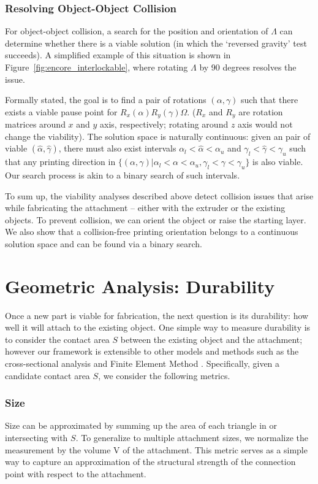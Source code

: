 \subsubsection{Resolving Object-Object Collision}
For object-object collision, a search for the position and orientation of $\Lambda$ can determine whether there is a viable solution (in which the ‘reversed gravity' test succeeds). A simplified example of this situation is shown in Figure~\ref{fig:encore_interlockable}, where rotating $\Lambda$ by 90 degrees resolves the issue.

Formally stated, the goal is to find a pair of rotations $(\alpha, \gamma)$ such that there exists a viable pause point for $R_x(\alpha)R_y(\gamma)\Omega$. ($R_x$ and $R_y$ are rotation matrices around $x$ and $y$ axis, respectively; rotating around $z$ axis would not change the viability). The solution space is naturally continuous: given an pair of viable $(\hat{\alpha}, \hat{\gamma})$, there must also exist intervals $\alpha_l < \hat{\alpha} < \alpha_u$ and $\gamma_l < \hat{\gamma} < \gamma_u$ such that any printing direction in $\{(\alpha, \gamma) | \alpha_l < \alpha < \alpha_u, \gamma_l < \gamma < \gamma_u \}$ is also viable. Our search process is akin to a binary search of such intervals.

To sum up, the viability analyses described above detect collision issues that arise while fabricating the attachment – either with the extruder or the existing objects. To prevent collision, we can orient the object or raise the starting layer. We also show that a collision-free printing orientation belongs to a continuous solution space and can be found via a binary search.

\section{Geometric Analysis: Durability}
Once a new part is viable for fabrication, the next question is its durability: how well it will attach to the existing object. One simple way to measure durability is to consider the contact area $S$ between the existing object and the attachment; however our framework is extensible to other models and methods such as the cross-sectional analysis \cite{umetani2013cross} and Finite Element Method \cite{szabo1991finite}. Specifically, given a candidate contact area $S$, we consider the following metrics.

\subsubsection{Size}
Size can be approximated by summing up the area of each triangle in or intersecting with $S$. To generalize to multiple attachment sizes, we normalize the measurement by the volume V of the attachment. This metric serves as a simple way to capture an approximation of the structural strength of the connection point with respect to the attachment.

